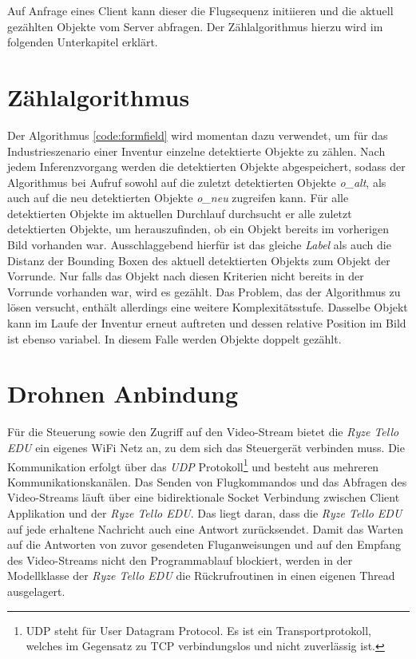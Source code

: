 Auf Anfrage eines Client kann dieser die Flugsequenz initiieren und die aktuell gezählten Objekte vom Server abfragen. Der Zählalgorithmus hierzu wird im folgenden Unterkapitel erklärt. 

\newpage

\section{Zählalgorithmus}



Der Algorithmus \ref{code:formfield} wird momentan dazu verwendet, um für das Industrieszenario einer Inventur einzelne detektierte Objekte zu zählen. Nach jedem Inferenzvorgang werden die detektierten Objekte abgespeichert, sodass der Algorithmus bei Aufruf sowohl auf die zuletzt detektierten Objekte \textit{o\_alt}, als auch auf die neu detektierten Objekte \textit{o\_neu} zugreifen kann. Für alle detektierten Objekte im aktuellen Durchlauf durchsucht er alle zuletzt detektierten Objekte, um herauszufinden, ob ein Objekt bereits im vorherigen Bild vorhanden war. Ausschlaggebend hierfür ist das gleiche \textit{Label} als auch die Distanz der Bounding Boxen des aktuell detektierten Objekts zum Objekt der Vorrunde. Nur falls das Objekt nach diesen Kriterien nicht bereits in der Vorrunde vorhanden war, wird es gezählt. Das Problem, das der Algorithmus zu lösen versucht, enthält allerdings eine weitere Komplexitätsstufe. Dasselbe Objekt kann im Laufe der Inventur erneut auftreten und dessen relative Position im Bild ist ebenso variabel. In diesem Falle werden Objekte doppelt gezählt. 

\section{Drohnen Anbindung}

Für die Steuerung sowie den Zugriff auf den Video-Stream bietet die \textit{Ryze Tello EDU} ein eigenes WiFi Netz an, zu dem sich das Steuergerät verbinden muss. Die Kommunikation erfolgt über das \textit{UDP} Protokoll\footnote{UDP steht für User Datagram Protocol. Es ist ein Transportprotokoll, welches im Gegensatz zu TCP verbindungslos und nicht zuverlässig ist.} und besteht aus mehreren Kommunikationskanälen. Das Senden von Flugkommandos und das Abfragen des Video-Streams läuft über eine bidirektionale Socket Verbindung zwischen Client Applikation und der \textit{Ryze Tello EDU}. Das liegt daran, dass die \textit{Ryze Tello EDU} auf jede erhaltene Nachricht auch eine Antwort zurücksendet. Damit das Warten auf die Antworten von zuvor gesendeten Fluganweisungen und auf den Empfang des Video-Streams nicht den Programmablauf blockiert, werden in der Modellklasse der \textit{Ryze Tello EDU} die Rückrufroutinen in einen eigenen Thread ausgelagert.

